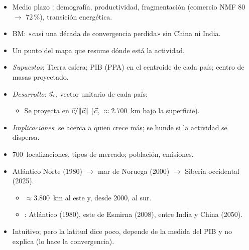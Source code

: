 \documentclass{article}
\begin{document}
\begin{columnas}
\begin{itemize}
\item Medio plazo : demografía, productividad, fragmentación (comercio NMF 80 $\to$ 72\,\%), transición energética.
\item BM: «casi una década de convergencia perdida» sin China ni India.
\end{itemize}
\begin{itemize}
\item Un punto del mapa que resume dónde está la actividad.
\end{itemize}
\begin{itemize}
\item \emph{Supuestos}: Tierra esfera; PIB (PPA) en el centroide de cada país; centro de masas proyectado.
\item \emph{Desarrollo}: $\vec{u}_i$, vector unitario de cada país:
  \begin{itemize}
  \item Se proyecta en $\vec{c}/\lVert\vec{c}\rVert$ ($\vec{c}$, $\approx$2.700~km bajo la superficie).
  \end{itemize}
\item \emph{Implicaciones}: se acerca a quien crece más; se hunde si la actividad se dispersa.
\end{itemize}
\begin{itemize}
\item 700~localizaciones, tipos de mercado; población, emisiones.
\item Atlántico Norte (1980) $\to$ mar de Noruega (2000) $\to$ Siberia occidental (2025).
  \begin{itemize}
  \item $\approx$3.800~km al este y, desde 2000, al sur.
  \item {}: Atlántico (1980), este de Esmirna (2008), entre India y China (2050).
  \end{itemize}
\end{itemize}
\begin{itemize}
\item Intuitivo; pero la latitud dice poco, depende de la medida del PIB y no explica (lo hace la convergencia).
\end{itemize}


\end{columnas}
\end{document}
